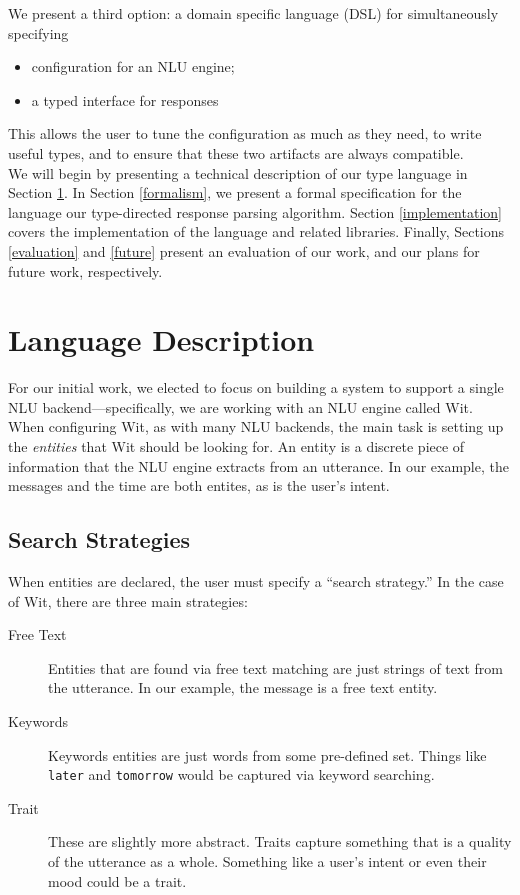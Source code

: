 \documentclass[twocolumn]{article}
\newcommand{\ts}[1]{\texttt{#1}}
\begin{document}
We present a third option: a domain specific language (DSL) for simultaneously
specifying
\begin{itemize}
\item configuration for an NLU engine;
\item a typed interface for responses
\end{itemize}
This allows the user to tune the configuration as much as they need, to write
useful types, and to ensure that these two artifacts are always compatible.
\\

We will begin by presenting a technical description of our type language in
Section \ref{description}. In Section \ref{formalism}, we present a formal
specification for the language our type-directed response parsing algorithm.
Section \ref{implementation} covers the implementation of the language and
related libraries. Finally, Sections \ref{evaluation} and \ref{future} present
an evaluation of our work, and our plans for future work, respectively.

\section{Language Description} \label{description}
For our initial work, we elected to focus on building a system to support a
single NLU backend---specifically, we are working with an NLU engine called
Wit.\cite{wit} When configuring Wit, as with many NLU backends, the main task is
setting up the \emph{entities} that Wit should be looking for. An entity is a
discrete piece of information that the NLU engine extracts from an utterance. In
our example, the messages and the time are both entites, as is the user's
intent.

\subsection{Search Strategies}
When entities are declared, the user must specify a ``search strategy.'' In the
case of Wit, there are three main strategies:
\begin{description}
\item[Free Text] Entities that are found via free text matching are just strings
of text from the utterance. In our example, the message is a free text entity.
\item[Keywords] Keywords entities are just words from some pre-defined set.
  Things like \ts{later} and
  \ts{tomorrow} would be captured via keyword searching.
\item[Trait] These are slightly more abstract. Traits capture something that is
  a quality of the utterance as a whole. Something like a user's intent or even
  their mood could be a trait.
\end{description}
\end{document}
